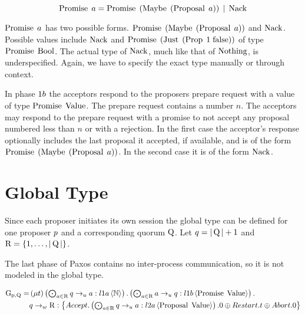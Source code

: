 \[\operatorname{Promise}\; a = \operatorname{Promise}\; \left(\operatorname{Maybe}\; \left(\operatorname{Proposal}\; a\right)\right) \; | \; \operatorname{Nack}\]

$\operatorname{Promise}\; a$ has two possible forms.
$\operatorname{Promise}\; \left(\operatorname{Maybe}\; \left(\operatorname{Proposal}\; a\right)\right)$ and $\operatorname{Nack}$.
Possible values include $\operatorname{Nack}$ and $\operatorname{Promise}\; \left(\operatorname{Just}\; \left(\operatorname{Prop}\; 1\; {\operatorname{false}}\right)\right)$ of type $\operatorname{Promise}\; \mathbb{\operatorname{Bool}}$.
The actual type of $\operatorname{Nack}$, much like that of $\operatorname{Nothing}$, is underspecified.
Again, we have to specify the exact type manually or through context.

In phase $1b$ the acceptors respond to the proposers prepare request with a value of type $\operatorname{Promise}\; \operatorname{Value}$.
The prepare request contains a number $n$.
The acceptors may respond to the prepare request with a promise to not accept any proposal numbered less than $n$ or with a rejection.
In the first case the acceptor's response optionally includes the last proposal it accepted, if available, and is of the form $\operatorname{Promise}\; \left(\operatorname{Maybe}\; \left(\operatorname{Proposal}\; a\right)\right)$.
In the second case it is of the form $\operatorname{Nack}$.

\section{Global Type}
Since each proposer initiates its own session the global type can be defined for one proposer $p$ and a corresponding quorum $\operatorname{Q}$.
Let $q = |\operatorname{Q}| + 1$ and $\operatorname{R} = \left\{1,\ldots,|\operatorname{Q}|\right\}$.

The last phase of Paxos contains no inter-process communication, so it is not modeled in the global type.

\begin{align*}
    \operatorname{G_{p, \operatorname{Q}}} =&
        \left(\mu t\right)
        \textstyle\left(\bigodot_{
            a \in \operatorname{R}
        } 
            q \to_u a : l1a \left\langle \mathbb{N} \right\rangle
        \right) .
        \textstyle\left(\bigodot_{
            a \in \operatorname{R}
        } 
            a \to_u q : l1b \left\langle \operatorname{Promise}\; \operatorname{Value} \right\rangle
        \right) .\\
    &
        q \to_w \operatorname{R} : \left\{
            \mathnormal{Accept}.
                \textstyle\left(\bigodot_{
                    a \in \operatorname{R}
                } 
                    q \to_u a : l2a \left\langle \operatorname{Proposal}\; \operatorname{Value} \right\rangle
                \right).
                0
            \oplus \mathnormal{Restart}.
                t
            \oplus \mathnormal{Abort}.
                0
        \right\}
\end{align*}

